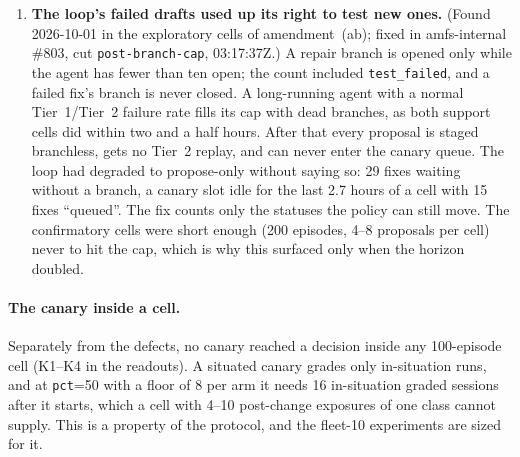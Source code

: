 \documentclass[11pt]{article}
\newcommand{\code}[1]{\texttt{#1}}
\begin{document}
\begin{enumerate}[leftmargin=1.6em, itemsep=0.35em]
naming a correction under test as the entry to avoid. The engine already held the rule that a
replay is not traffic where the loop grades (finding~8); \#455 completes it on the memory side.
A replay's outcome writes no outcome row, and a discredited entry is pinned on its own branch all
the same, because the canary can only test what the arm read.
\item \textbf{The loop's failed drafts used up its right to test new ones.} (Found 2026-10-01
in the exploratory cells of amendment~(ab); fixed in amfs-internal \#803, cut
\code{post-branch-cap}, 03:17:37Z.) A repair branch is opened only while the agent has fewer
than ten open; the count included \code{test\_failed}, and a failed fix's branch is never
closed. A long-running agent with a normal Tier~1/Tier~2 failure rate fills its cap with dead
branches, as both support cells did within two and a half hours. After that every proposal is
staged branchless, gets no Tier~2 replay, and can never enter the canary queue. The loop had
degraded to propose-only without saying so: 29 fixes waiting without a branch, a canary slot
idle for the last 2.7 hours of a cell with 15 fixes ``queued''. The fix counts only the statuses
the policy can still move. The confirmatory cells were short enough (200 episodes, 4--8
proposals per cell) never to hit the cap, which is why this surfaced only when the horizon
doubled.
\end{enumerate}

\paragraph{The canary inside a cell.} Separately from the defects, no canary reached a decision
inside any 100-episode cell (K1--K4 in the readouts). A situated canary grades only
in-situation runs, and at \code{pct}=50 with a floor of 8 per arm it needs 16 in-situation
graded sessions after it starts, which a cell with 4--10 post-change exposures of one class
cannot supply. This is a property of the protocol, and the fleet-10 experiments are sized for it.
\end{document}
